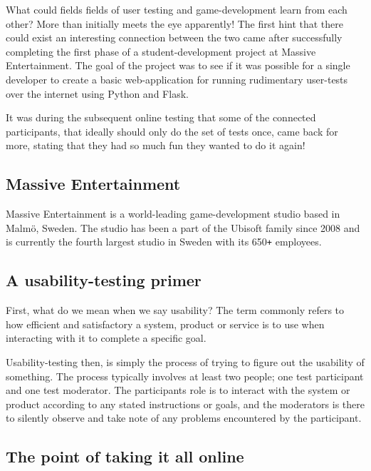 \documentclass{article}
\begin{document}
  \begin{multicols*}{2}[]
    What could fields fields of user testing and game-development learn from
    each other? More than initially meets the eye apparently! The first hint
    that there could exist an interesting connection between the two came after
    successfully completing the first phase of a student-development project at
    Massive Entertainment. The goal of the project was to see if it was
    possible for a single developer to create a basic web-application for
    running rudimentary user-tests over the internet using Python and Flask.

    It was during the subsequent online testing that some of the connected
    participants, that ideally should only do the set of tests once, came back
    for more, stating that they had so much fun they wanted to do it again!

  \subsection*{Massive Entertainment}

    Massive Entertainment is a world-leading game-development studio
    based in Malmö, Sweden. The studio has been a part of the Ubisoft family
    since 2008 and is currently the fourth largest studio in Sweden with its
    650\texttt{+} employees.

  \subsection*{A usability-testing primer}

    First, what do we mean when we say usability? The term commonly refers to
    how efficient and satisfactory a system, product or service is to use when
    interacting with it to complete a specific goal.

    Usability-testing then, is simply the process of trying to figure out the
    usability of something. The process typically involves at least two people;
    one test participant and one test moderator. The participants role is to
    interact with the system or product according to any stated instructions or
    goals, and the moderators is there to silently observe and take note of any
    problems encountered by the participant.

  \subsection*{The point of taking it all online}


\end{multicols*}
\end{document}
